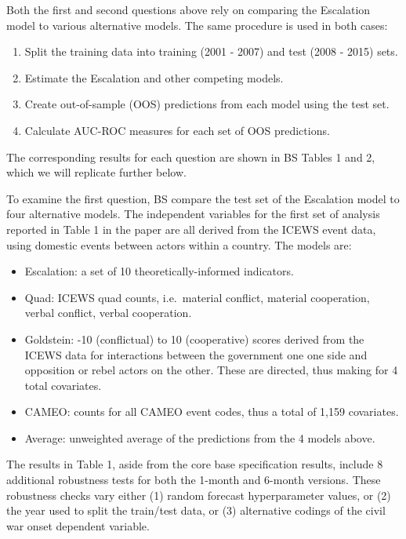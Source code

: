\documentclass[]{article}
\providecommand{\tightlist}{%
  \setlength{\itemsep}{0pt}\setlength{\parskip}{0pt}}
\begin{document}
Both the first and second questions above rely on comparing the
Escalation model to various alternative models. The same procedure is
used in both cases:

\begin{enumerate}
\def\labelenumi{\arabic{enumi}.}
\tightlist
\item
  Split the training data into training (2001 - 2007) and test (2008 -
  2015) sets.
\item
  Estimate the Escalation and other competing models.
\item
  Create out-of-sample (OOS) predictions from each model using the test
  set.
\item
  Calculate AUC-ROC measures for each set of OOS predictions.
\end{enumerate}

The corresponding results for each question are shown in BS Tables 1 and
2, which we will replicate further below.

To examine the first question, BS compare the test set of the Escalation
model to four alternative models. The independent variables for the
first set of analysis reported in Table 1 in the paper are all derived
from the ICEWS event data, using domestic events between actors within a
country. The models are:

\begin{itemize}
\tightlist
\item
  Escalation: a set of 10 theoretically-informed indicators.
\item
  Quad: ICEWS quad counts, i.e.~material conflict, material cooperation,
  verbal conflict, verbal cooperation.
\item
  Goldstein: -10 (conflictual) to 10 (cooperative) scores derived from
  the ICEWS data for interactions between the government one one side
  and opposition or rebel actors on the other. These are directed, thus
  making for 4 total covariates.
\item
  CAMEO: counts for all CAMEO event codes, thus a total of 1,159
  covariates.
\item
  Average: unweighted average of the predictions from the 4 models
  above.
\end{itemize}

The results in Table 1, aside from the core base specification results,
include 8 additional robustness tests for both the 1-month and 6-month
versions. These robustness checks vary either (1) random forecast
hyperparameter values, or (2) the year used to split the train/test
data, or (3) alternative codings of the civil war onset dependent
variable.
\end{document}
